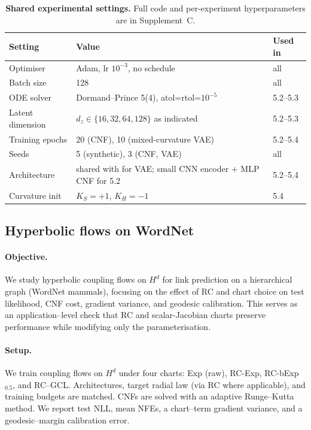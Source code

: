 \documentclass{article}
\theoremstyle{definition}
\theoremstyle{remark}
\begin{document}
\label{app:extra_experiments}

\begin{table}[h]
\centering
\small
\setlength{\tabcolsep}{4pt}
\begin{tabular}{lll}
\toprule
Setting & Value & Used in \\
\midrule
Optimiser & Adam, lr $10^{-3}$, no schedule & all \\
Batch size & 128 & all \\
ODE solver & Dormand--Prince 5(4), atol=rtol=$10^{-5}$ & 5.2--5.3 \\
Latent dimension & $d_z\in\{16,32,64,128\}$ as indicated & 5.2--5.3 \\
Training epochs & 20 (CNF), 10 (mixed-curvature VAE) & 5.2--5.4 \\
Seeds & 5 (synthetic), 3 (CNF, VAE) & all \\
Architecture & shared with \cite{skopek2019mixed} for VAE; small CNN encoder + MLP CNF for 5.2 & 5.2--5.4 \\
Curvature init & $K_S=+1$, $K_H=-1$ & 5.4 \\
\bottomrule
\end{tabular}
\caption{\textbf{Shared experimental settings.} Full code and per-experiment hyperparameters are in Supplement~C.}
\label{tab:hyperparams}
\end{table}



\subsection{Hyperbolic flows on WordNet}
\label{exp:E4_main}

\paragraph{Objective.}
We study hyperbolic coupling flows on $H^d$ for link prediction on a
hierarchical graph (WordNet mammals), focusing on the effect of RC and
chart choice on test likelihood, CNF cost, gradient variance, and
geodesic calibration.
This serves as an application--level check that RC and scalar-Jacobian
charts preserve performance while modifying only the parameterisation.

\paragraph{Setup.}
We train coupling flows on $H^d$ under four charts:
Exp (raw), RC-Exp, RC-bExp$_{0.5}$, and RC--GCL.
Architectures, target radial law (via RC where applicable), and training
budgets are matched.
CNFs are solved with an adaptive Runge--Kutta method.
We report test NLL, mean NFEs, a chart--term gradient variance, and a
geodesic--margin calibration error.
\end{document}

